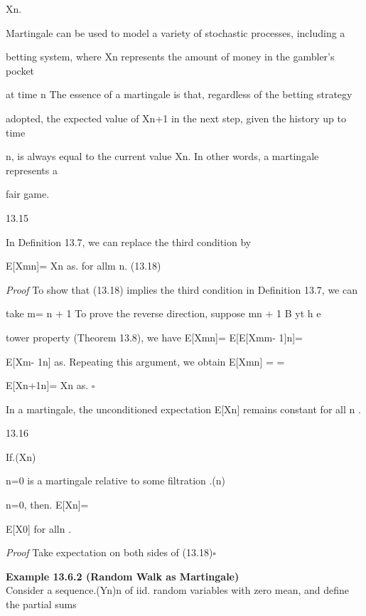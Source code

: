Xn.

Martingale can be used to model a variety of stochastic processes, including a

betting system, where Xn represents the amount of money in the gambler's pocket

at time n The essence of a martingale is that, regardless of the betting strategy

adopted, the expected value of Xn+1 in the next step, given the history up to time

n, is always equal to the current value Xn. In other words, a martingale represents a

fair game.

\begin{thmbox}{13.15}
\end{thmbox}

In Definition 13.7, we can replace the third condition by

E[Xm\vert{}n]= Xn as. for allm \geq n. (13.18)

\textit{Proof} To show that (13.18) implies the third condition in Definition 13.7, we can

take m= n + 1 To prove the reverse direction, suppose m\geq n + 1 B yt h e

tower property (Theorem 13.8), we have E[Xm\vert{}n]= E[E[Xm\vert{}m- 1]\vert{}n]=

E[Xm- 1\vert{}n] as. Repeating this argument, we obtain E[Xm\vert{}n] = \cdot\cdot\cdot =

E[Xn+1\vert{}n]= Xn as. \hfill $\square$

In a martingale, the unconditioned expectation E[Xn] remains constant for all n .

\begin{thmbox}{13.16}
\end{thmbox}

If.(Xn)\infty

n=0 is a martingale relative to some filtration .(n)\infty

n=0, then. E[Xn]=

E[X0] for alln .

\textit{Proof} Take expectation on both sides of (13.18)\hfill $\square$

\textbf{Example 13.6.2 (Random Walk as Martingale)} \\

Consider a sequence.(Yn)n of iid. random variables with zero mean, and define the partial sums

